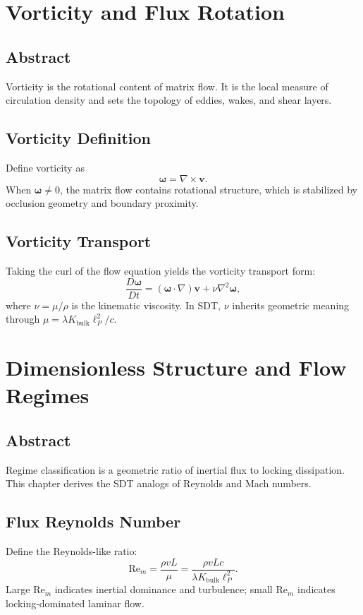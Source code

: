 \documentclass[12pt]{book}
\begin{document}
\chapter{Vorticity and Flux Rotation}

\section*{Abstract}
Vorticity is the rotational content of matrix flow. It is the local measure of circulation density and
sets the topology of eddies, wakes, and shear layers.

\section{Vorticity Definition}
Define vorticity as
\begin{equation}
\boldsymbol{\omega} = \nabla \times \mathbf{v}.
\end{equation}
When $\boldsymbol{\omega} \neq 0$, the matrix flow contains rotational structure, which is stabilized
by occlusion geometry and boundary proximity.

\section{Vorticity Transport}
Taking the curl of the flow equation yields the vorticity transport form:
\begin{equation}
\frac{D\boldsymbol{\omega}}{Dt} = (\boldsymbol{\omega}\cdot\nabla)\mathbf{v} + \nu \nabla^2 \boldsymbol{\omega},
\end{equation}
where $\nu = \mu/\rho$ is the kinematic viscosity. In SDT, $\nu$ inherits geometric meaning through
$\mu = \lambda K_{\text{bulk}}\ell_P^2/c$.

\chapter{Dimensionless Structure and Flow Regimes}

\section*{Abstract}
Regime classification is a geometric ratio of inertial flux to locking dissipation. This chapter derives
the SDT analogs of Reynolds and Mach numbers.

\section{Flux Reynolds Number}
Define the Reynolds-like ratio:
\begin{equation}
\mathrm{Re}_m = \frac{\rho v L}{\mu} = \frac{\rho v L c}{\lambda K_{\text{bulk}}\ell_P^2}.
\end{equation}
Large $\mathrm{Re}_m$ indicates inertial dominance and turbulence; small $\mathrm{Re}_m$ indicates
locking-dominated laminar flow.
\end{document}
